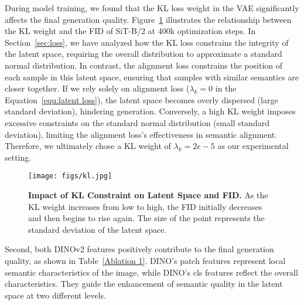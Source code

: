 During model training, we found that the KL loss weight in the VAE significantly affects the final generation quality. Figure~\ref{fig:kl} illustrates the relationship between the KL weight and the FID of SiT-B/2 at 400k optimization steps. In Section~\ref{sec:loss}, we have analyzed how the KL loss constrains the integrity of the latent space, requiring the overall distribution to approximate a standard normal distribution. In contrast, the alignment loss constrains the position of each sample in this latent space, ensuring that samples with similar semantics are closer together. If we rely solely on alignment loss ($\lambda_k=0$ in the Equation~\ref{equ:latent loss}), the latent space becomes overly dispersed (large standard deviation), hindering generation. Conversely, a high KL weight imposes excessive constraints on the standard normal distribution (small standard deviation), limiting the alignment loss's effectiveness in semantic alignment. Therefore, we ultimately chose a KL weight of $\lambda_k=2e-5$ as our experimental setting.

\begin{figure}[ht]
    \centering
    \texttt{[image: figs/kl.jpg]}
    \vspace{-1em}
    \caption{\textbf{Impact of KL Constraint on Latent Space and FID.} As the KL weight increases from low to high, the FID initially decreases and then begins to rise again. The size of the point represents the standard deviation of the latent space.}
    \label{fig:kl}
    \vspace{-1.0cm}
\end{figure}

Second, both DINOv2 features positively contribute to the final generation quality, as shown in Table~\ref{Ablation 1}. DINO's patch features represent local semantic characteristics of the image, while DINO's cls features reflect the overall characteristics. They guide the enhancement of semantic quality in the latent space at two different levels.


